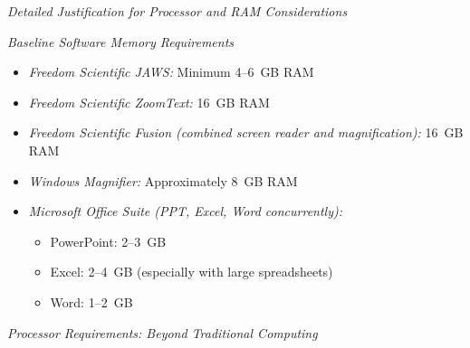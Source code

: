 \emph{Detailed Justification for Processor and RAM Considerations}

\emph{Baseline Software Memory Requirements}
\begin{itemize}
    \item \emph{Freedom Scientific JAWS:} Minimum 4--6~GB RAM
    \item \emph{Freedom Scientific ZoomText:} 16~GB RAM
    \item \emph{Freedom Scientific Fusion (combined screen reader and magnification):} 16~GB RAM
    \item \emph{Windows Magnifier:} Approximately 8~GB RAM
    \item \emph{Microsoft Office Suite (PPT, Excel, Word concurrently):}
        \begin{itemize}
            \item PowerPoint: 2--3~GB
            \item Excel: 2--4~GB (especially with large spreadsheets)
            \item Word: 1--2~GB
        \end{itemize}
\end{itemize}

\emph{Processor Requirements: Beyond Traditional Computing}

